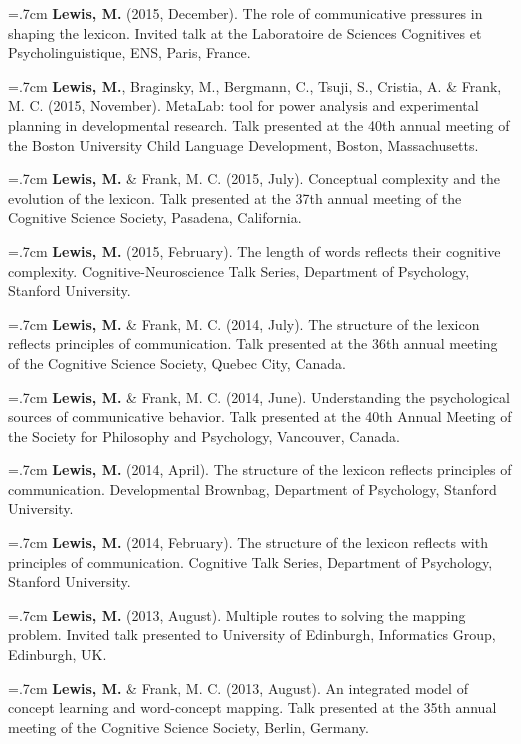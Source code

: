 \documentclass[letterpaper]{article}
\begin{document}
\hangindent=.7cm {\bf Lewis, M.} (2015, December). The role of communicative pressures in shaping the lexicon. Invited talk at the Laboratoire de Sciences Cognitives et Psycholinguistique, ENS, Paris, France.

\hangindent=.7cm {\bf Lewis, M.},  Braginsky,  M.,  Bergmann, C., Tsuji, S., Cristia, A. \& Frank, M. C. (2015, November). MetaLab: tool for power analysis and experimental planning in developmental research. Talk presented at the 40th annual meeting of the Boston University Child Language Development, Boston, Massachusetts.

\hangindent=.7cm {\bf Lewis, M.} \& Frank, M. C. (2015, July). Conceptual complexity and the evolution of the lexicon. Talk presented at the 37th annual meeting of the Cognitive Science Society, Pasadena, California.

\hangindent=.7cm {\bf Lewis, M.}  (2015, February). The length of words reflects their cognitive complexity. Cognitive-Neuroscience Talk Series, Department of Psychology, Stanford University.

\hangindent=.7cm {\bf Lewis, M.} \& Frank, M. C. (2014, July). The structure of the lexicon reflects  principles of communication. Talk presented at the 36th annual meeting of the Cognitive Science Society, Quebec City, Canada.

\hangindent=.7cm {\bf Lewis, M.} \& Frank, M. C. (2014, June). Understanding the psychological sources of communicative behavior. Talk presented at the 40th Annual Meeting of the Society for Philosophy and Psychology, Vancouver, Canada.

\hangindent=.7cm {\bf Lewis, M.} (2014, April). The structure of the lexicon reflects principles of communication. Developmental Brownbag, Department of Psychology, Stanford University.

\hangindent=.7cm {\bf Lewis, M.} (2014, February). The structure of the lexicon reflects with principles of communication. Cognitive Talk Series, Department of Psychology, Stanford University.

 \hangindent=.7cm {\bf Lewis, M.} (2013, August). Multiple routes to solving the mapping problem. Invited talk presented to University of Edinburgh, Informatics Group,  Edinburgh, UK.

 \hangindent=.7cm {\bf Lewis, M.}  \& Frank, M. C. (2013, August). An integrated model of concept learning and word-concept mapping. Talk presented at the 35th annual meeting of the Cognitive Science Society, Berlin, Germany.
 
\end{document}
